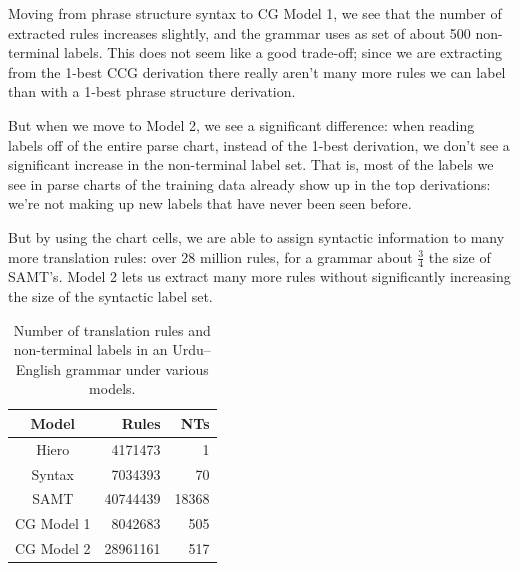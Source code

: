 \documentclass[a4paper]{article}
\begin{document}
Moving from phrase structure syntax to CG Model 1, we see that the number of extracted rules increases slightly, and the grammar uses as set of about 500 non-terminal labels. This does not seem like a good trade-off; since we are extracting from the 1-best CCG derivation there really aren't many more rules we can label than with a 1-best phrase structure derivation.

But when we move to Model 2, we see a significant difference: when reading labels off of the entire parse chart, instead of the 1-best derivation, we don't see a significant increase in the non-terminal label set. That is, most of the labels we see in parse charts of the training data already show up in the top derivations: we're not making up new labels that have never been seen before.

But by using the chart cells, we are able to assign syntactic information to many more translation rules: over 28 million rules, for a grammar about $\frac{3}{4}$ the size of SAMT's. Model 2 lets us extract many more rules without significantly increasing the size of the syntactic label set.

\begin{table}
\centering
\begin{tabular}{|c|r|r|}
\hline
Model & Rules & NTs\\
\hline
Hiero & 4171473 & 1\\
Syntax & 7034393 & 70\\
SAMT & 40744439 & 18368\\
CG Model 1 & 8042683 & 505\\
CG Model 2 & 28961161 & 517\\
\hline
\end{tabular}
\caption{Number of translation rules and non-terminal labels in an Urdu--English grammar under various models.\label{table:rule-count}}
\end{table}

\end{document}
